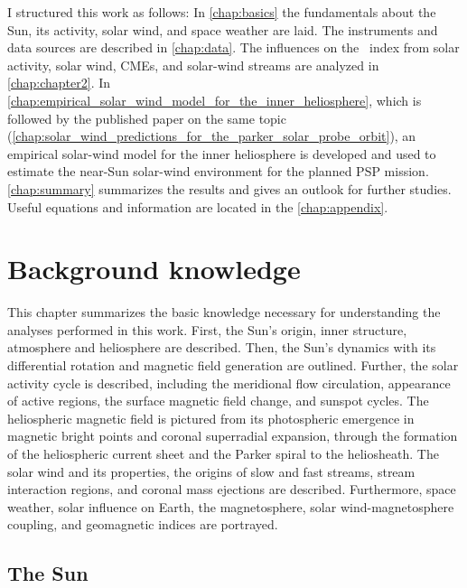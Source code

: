 I structured this work as follows: In \autoref{chap:basics} the fundamentals about the Sun, its activity, solar wind, and space weather are laid. The instruments and data sources are described in \autoref{chap:data}. The influences on the \Kp{}~index from solar activity, solar wind, CMEs, and solar-wind streams are analyzed in \autoref{chap:chapter2}. In \autoref{chap:empirical_solar_wind_model_for_the_inner_heliosphere}, which is followed by the published paper on the same topic (\autoref{chap:solar_wind_predictions_for_the_parker_solar_probe_orbit}), an empirical solar-wind model for the inner heliosphere is developed and used to estimate the near-Sun solar-wind environment for the planned PSP mission. \autoref{chap:summary} summarizes the results and gives an outlook for further studies. Useful equations and information are located in the \autoref{chap:appendix}.



\chapter{Background knowledge}
\label{chap:basics}
This chapter summarizes the basic knowledge necessary for understanding the analyses performed in this work. First, the Sun's origin, inner structure, atmosphere and heliosphere are described. Then, the Sun's dynamics with its differential rotation and magnetic field generation are outlined. Further, the solar activity cycle is described, including the meridional flow circulation, appearance of active regions, the surface magnetic field change, and sunspot cycles. The heliospheric magnetic field is pictured from its photospheric emergence in magnetic bright points and coronal superradial expansion, through the formation of the heliospheric current sheet and the Parker spiral to the heliosheath. The solar wind and its properties, the origins of slow and fast streams, stream interaction regions, and coronal mass ejections are described. Furthermore, space weather, solar influence on Earth, the magnetosphere, solar wind-magnetosphere coupling, and geomagnetic indices are portrayed.


\section{The Sun}
\label{sec:solar_composition}

